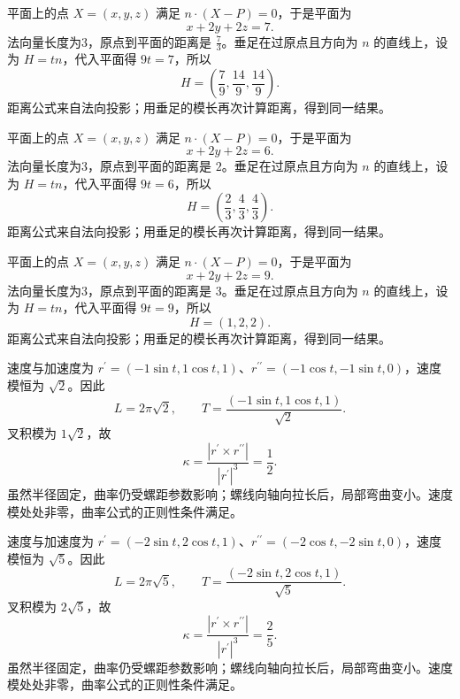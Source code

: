 \documentclass[12pt,fontset=fandol]{ctexart}
\begin{document}
\begin{solve}\label{ans:c31q10}
平面上的点 $X=(x,y,z)$ 满足 $n\cdot(X-P)=0$，于是平面为
\[
x+2y+2z=7.
\]
法向量长度为3，原点到平面的距离是 $\frac{7}{3}$。垂足在过原点且方向为 $n$ 的直线上，设为 $H=tn$，代入平面得 $9t=7$，所以
\[
H=\left(\frac{7}{9},\frac{14}{9},\frac{14}{9}\right).
\]
距离公式来自法向投影；用垂足的模长再次计算距离，得到同一结果。
\end{solve}

\begin{solve}\label{ans:c31q11}
平面上的点 $X=(x,y,z)$ 满足 $n\cdot(X-P)=0$，于是平面为
\[
x+2y+2z=6.
\]
法向量长度为3，原点到平面的距离是 $2$。垂足在过原点且方向为 $n$ 的直线上，设为 $H=tn$，代入平面得 $9t=6$，所以
\[
H=\left(\frac{2}{3},\frac{4}{3},\frac{4}{3}\right).
\]
距离公式来自法向投影；用垂足的模长再次计算距离，得到同一结果。
\end{solve}

\begin{solve}\label{ans:c31q12}
平面上的点 $X=(x,y,z)$ 满足 $n\cdot(X-P)=0$，于是平面为
\[
x+2y+2z=9.
\]
法向量长度为3，原点到平面的距离是 $3$。垂足在过原点且方向为 $n$ 的直线上，设为 $H=tn$，代入平面得 $9t=9$，所以
\[
H=\left(1,2,2\right).
\]
距离公式来自法向投影；用垂足的模长再次计算距离，得到同一结果。
\end{solve}

\begin{solve}\label{ans:c31q13}
速度与加速度为 $r^{\prime}=(-1\sin t,1\cos t,1)$、$r^{\prime\prime}=(-1\cos t,-1\sin t,0)$，速度模恒为 $\sqrt{2}$。因此
\[
L=2\pi\sqrt{2},\qquad T=\frac{(-1\sin t,1\cos t,1)}{\sqrt{2}}.
\]
叉积模为 $1\sqrt{2}$，故
\[
\kappa=\frac{|r^{\prime}\times r^{\prime\prime}|}{|r^{\prime}|^3}=\frac{1}{2}.
\]
虽然半径固定，曲率仍受螺距参数影响；螺线向轴向拉长后，局部弯曲变小。速度模处处非零，曲率公式的正则性条件满足。
\end{solve}

\begin{solve}\label{ans:c31q14}
速度与加速度为 $r^{\prime}=(-2\sin t,2\cos t,1)$、$r^{\prime\prime}=(-2\cos t,-2\sin t,0)$，速度模恒为 $\sqrt{5}$。因此
\[
L=2\pi\sqrt{5},\qquad T=\frac{(-2\sin t,2\cos t,1)}{\sqrt{5}}.
\]
叉积模为 $2\sqrt{5}$，故
\[
\kappa=\frac{|r^{\prime}\times r^{\prime\prime}|}{|r^{\prime}|^3}=\frac{2}{5}.
\]
虽然半径固定，曲率仍受螺距参数影响；螺线向轴向拉长后，局部弯曲变小。速度模处处非零，曲率公式的正则性条件满足。
\end{solve}
\end{document}
